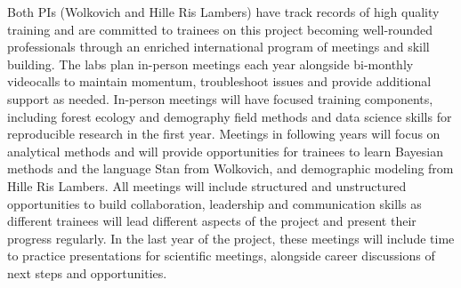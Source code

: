 \documentclass[12pt,oneside]{article}
\begin{document}
Both PIs (Wolkovich and Hille Ris Lambers) have track records of high quality training and are committed to trainees on this project becoming well-rounded professionals through an enriched international program of meetings and skill building. The labs plan in-person meetings each year  alongside bi-monthly videocalls to maintain momentum, troubleshoot issues and provide additional support as needed. In-person meetings will have focused training components, including forest ecology and demography field methods and data science skills for reproducible research in the first year. Meetings in following years will focus on analytical methods and will provide  opportunities for trainees to learn Bayesian methods and the language Stan from Wolkovich, and demographic modeling from Hille Ris Lambers. All meetings will include structured and unstructured opportunities to build collaboration, leadership and communication skills as different trainees will lead different aspects of the project and present their progress regularly. In the last year of the project, these meetings will include time to practice presentations for scientific meetings, alongside career discussions of next steps and opportunities.  %
\end{document}
